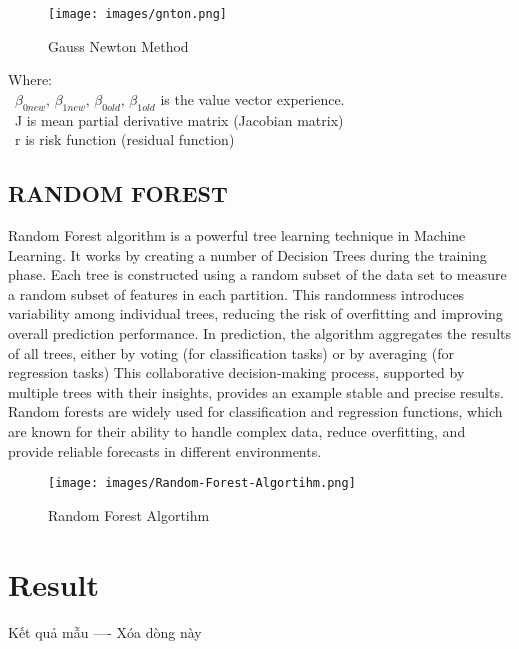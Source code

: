 \documentclass{ieeeojies}
\begin{document}
\begin{figure}[H]
    \centering
    \begin{minipage}{0.28\textwidth}
    \centering
   \texttt{[image: images/gnton.png]}
    \caption{Gauss Newton Method}
    \label{fig:1}
    \end{minipage}
\end{figure}

Where:\\
	\indent\textbullet\ \(\beta_{0new},\, \beta_{1new},\, \beta_{0old},\, \beta_{1old}\) is the value vector experience.\\
	\indent\textbullet\ J is mean partial derivative matrix (Jacobian matrix)\\
        \indent\textbullet\ r is risk function (residual function)

\subsection{RANDOM FOREST}
\indent Random Forest algorithm is a powerful tree learning technique in Machine Learning. It works by creating a number of Decision Trees during the training phase. Each tree is constructed using a random subset of the data set to measure a random subset of features in each partition. This randomness introduces variability among individual trees, reducing the risk of overfitting and improving overall prediction performance. In prediction, the algorithm aggregates the results of all trees, either by voting (for classification tasks) or by averaging (for regression tasks) This collaborative decision-making process, supported by multiple trees with their insights, provides an example stable and precise results. Random forests are widely used for classification and regression functions, which are known for their ability to handle complex data, reduce overfitting, and provide reliable forecasts in different environments.

\begin{figure}[H]
    \centering
    \begin{minipage}{0.28\textwidth}
    \centering
   \texttt{[image: images/Random-Forest-Algortihm.png]}
    \caption{Random Forest Algortihm}
    \label{fig:1}
    \end{minipage}
\end{figure}


\section{Result}
Kết quả mẫu ---- Xóa dòng này
\end{document}
